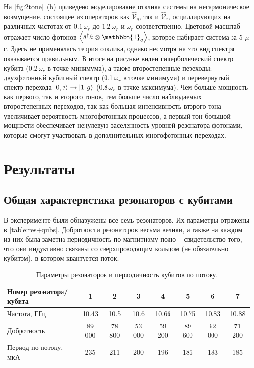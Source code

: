 \documentclass[12pt, twoside]{report}
\DeclarePairedDelimiter\ket{\lvert}{\rangle}
\numberwithin{equation}{section}
\numberwithin{figure}{section}
\begin{document}
На \autoref{fig:2tone}~(b) приведено моделирование отклика системы на негармоническое возмущение, состоящее из операторов как $\mathcal{\hat V}_q$, так и $\mathcal{\hat V}_r$, осциллирующих на различных частотах от $0.1\,\omega_r$ до $1.2\,\omega_r$ и $\omega_r$ соответственно. Цветовой масштаб отражает число фотонов $\left< \hat a^\dag \hat a \otimes \mathbbm{1}_q \right>$, которое набирает система за 5 $\mu$с. Здесь не применялась теория отклика, однако несмотря на это вид спектра оказывается правильным. В итоге на рисунке виден гиперболический спектр кубита (0.2$\,\omega_r$ в точке минимума), а также второстепенные переходы: двухфотонный кубитный спектр (0.1$\,\omega_r$ в точке минимума) и перевернутый спектр перехода $\ket{0, e}\rightarrow\ket{1,g}$ (0.8$\,\omega_r$ в точке максимума). Чем больше мощность как первого, так и второго тонов, тем больше число наблюдаемых второстепенных переходов, так как большая интенсивность второго тона увеличивает вероятность многофотонных процессов, а первый тон большой мощности обеспечивает ненулевую заселенность уровней резонатора фотонами, которые смогут участвовать в дополнительных многофотонных переходах.


\chapter{Результаты}

\section{Общая характеристика резонаторов с кубитами}

В эксперименте были обнаружены все семь резонаторов. Их параметры отражены в  \autoref{table:res+qubs}. Добротности резонаторов весьма велики, а также на каждом из них была заметна периодичность по магнитному полю -- свидетельство того, что они индуктивно связаны со сверхпроводящим кольцом (не обязательно кубитом), в котором квантуется поток.	

\begin{table}[h]

\begin{tabular}{|l|c|c|c|c|c|c|c|}
\hline
Номер резонатора/кубита & 1 & 2& 3&4&5&6&7 \\
\hline
Частота, ГГц & 10.43 & 10.5 & 10.6 & 10.66 & 10.75 & 10.83 & 10.88 \\
\hline
Добротность & 89 000 & 78 800 & 53 000 & 59 200 & 89 600 & 92 000 & 71 200\\ 
\hline
Период по потоку, мкА & 235 & 211 & 200 & 196 & 186 & 183 & 185\\
\hline
\end{tabular}
\caption{Параметры резонаторов и периодичность кубитов по потоку.}
\label{table:res+qubs}
\end{table}
\end{document}
